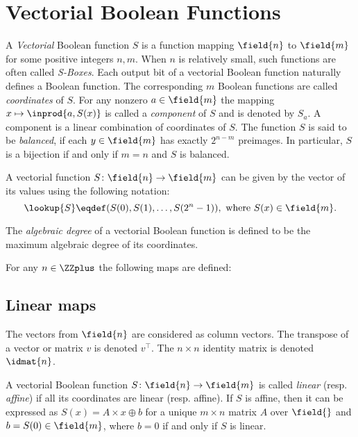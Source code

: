 \section{Vectorial Boolean Functions}
A \emph{Vectorial} Boolean function $S$ is a function mapping $\field{n}$ to $\field{m}$ for some positive integers $n,m$. When $n$ is relatively small, such functions are often called \emph{S-Boxes}. Each output bit of a vectorial Boolean function naturally defines a Boolean function. The corresponding $m$ Boolean functions are called \emph{coordinates} of $S$. For any nonzero $a \in \field{m}$ the mapping $x \mapsto \inprod{a, S(x)}$ is called a \emph{component} of $S$ and is denoted by $S_a$. A component is a linear combination of coordinates of $S$. The function $S$ is said to be \emph{balanced}, if each $y \in \field{m}$ has exactly $2^{n-m}$ preimages. In particular, $S$ is a bijection if and only if $m = n$ and $S$ is balanced.

A vectorial function $S\colon \field{n} \to \field{m}$ can be given by the vector of its values using the following notation:
$$
\lookup{S} \eqdef (S(0), S(1), \ldots, S(2^n-1)), ~\text{where}~ S(x) \in \field{m}.
$$

The \emph{algebraic degree} of a vectorial Boolean function is defined to be the maximum algebraic degree of its coordinates.

For any $n \in \ZZplus$ the following maps are defined:

\subsection{Linear maps}
The vectors from $\field{n}$ are considered as column vectors. The transpose of a vector or matrix $v$ is denoted $v^{\top}$. The $n\times n$ identity matrix is denoted $\idmat{n}$. 

A vectorial Boolean function $S\colon \field{n} \to \field{m}$ is called \emph{linear} (resp. \emph{affine}) if all its coordinates are linear (resp. affine). If $S$ is affine, then it can be expressed as $S(x) = A \times x \oplus b$ for a unique $m \times n$ matrix $A$ over $\field{}$ and $b = S(0) \in \field{m}$, where $b = 0$ if and only if $S$ is linear.


